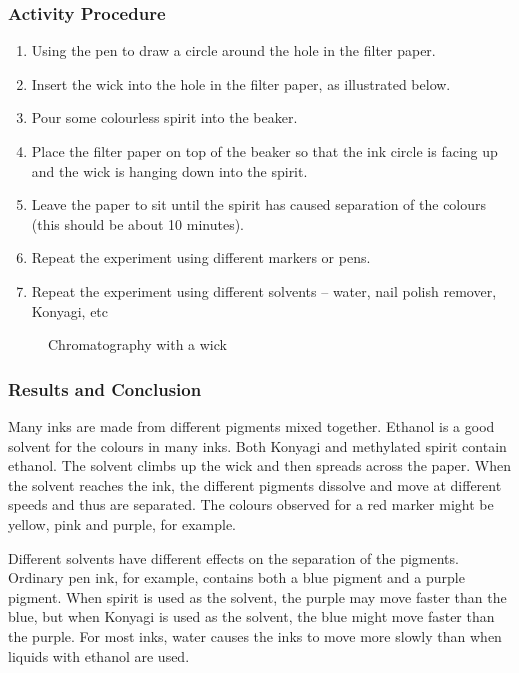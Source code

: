 \subsubsection*{Activity Procedure}
\begin{enumerate}
\item{Using the pen to draw a circle around the hole in the filter paper.}
\item{Insert the wick into the hole in the filter paper, as illustrated below.}
\item{Pour some colourless spirit into the beaker.}
\item{Place the filter paper on top of the beaker so that the ink circle is facing up and the wick is hanging down into the spirit.}
\item{Leave the paper to sit until the spirit has caused separation of the colours (this should be about 10 minutes).}
\item{Repeat the experiment using different markers or pens.}
\item{Repeat the experiment using different solvents -- water, nail polish remover, Konyagi, etc}
\end{enumerate}

\begin{figure}[h]
\begin{center}
\def\svgwidth{200pt}

\caption{Chromatography with a wick}
\end{center}
\end{figure}

\subsubsection*{Results and Conclusion}
Many inks are made from different pigments mixed together. Ethanol is a good solvent for the colours in many inks. Both Konyagi and methylated spirit contain ethanol. The solvent climbs up the wick and then spreads across the paper.  When the solvent reaches the ink, the different pigments dissolve and move at different speeds and thus are separated. The colours observed for a red marker might be yellow, pink and purple, for example.

Different solvents have different effects on the separation of the pigments. Ordinary pen ink, for example, contains both a blue pigment and a purple pigment. When spirit is used as the solvent, the purple may move faster than the blue, but when Konyagi is used as the solvent, the blue might move faster than the purple. For most inks, water causes the inks to move more slowly than when liquids with ethanol are used.

